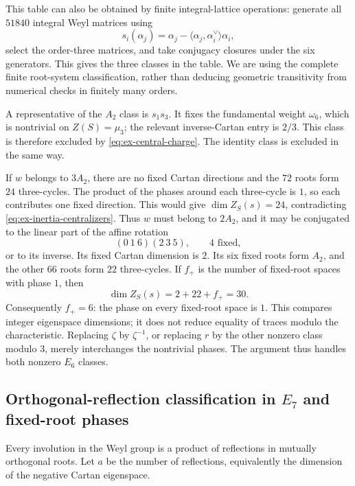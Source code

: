 \documentclass[11pt,a4paper]{article}
\theoremstyle{definition}
\theoremstyle{remark}
\begin{document}
This table can also be obtained by finite integral-lattice operations:
generate all \(51840\) integral Weyl matrices using
\[
s_i(\alpha_j)
=\alpha_j-\langle\alpha_j,\alpha_i^\vee\rangle\alpha_i,
\]
select the order-three matrices, and take conjugacy closures under the
six generators. This gives the three classes in the table.
We are using the complete finite root-system classification, rather than
deducing geometric transitivity from numerical checks in finitely many
orders.

A representative of the \(A_2\) class is \(s_1s_3\). It fixes the
fundamental weight \(\omega_6\), which is nontrivial on
\(Z(S)=\mu_3\); the relevant inverse-Cartan entry is \(2/3\).
This class is therefore excluded by \eqref{eq:ex-central-charge}.
The identity class is excluded in the same way.

If \(w\) belongs to \(3A_2\), there are no fixed Cartan directions and the
\(72\) roots form \(24\) three-cycles. The product of the phases around
each three-cycle is \(1\), so each contributes one fixed direction.
This would give \(\dim Z_S(s)=24\), contradicting
\eqref{eq:ex-inertia-centralizers}.
Thus \(w\) must belong to \(2A_2\), and it may be conjugated to the linear
part of the affine rotation
\begin{equation}\label{eq:ex-e6-affine-action}
(0\ 1\ 6)(2\ 3\ 5),\qquad 4\text{ fixed},
\end{equation}
or to its inverse.
Its fixed Cartan dimension is \(2\). Its six fixed roots form \(A_2\),
and the other \(66\) roots form \(22\) three-cycles.
If \(f_+\) is the number of fixed-root spaces with phase \(1\), then
\begin{equation}\label{eq:ex-e6-fixed-phase-count}
\dim Z_S(s)=2+22+f_+=30.
\end{equation}
Consequently \(f_+=6\): the phase on every fixed-root space is \(1\).
This compares integer eigenspace dimensions; it does not reduce equality
of traces modulo the characteristic.
Replacing \(\zeta\) by \(\zeta^{-1}\), or replacing \(r\) by the other
nonzero class modulo \(3\), merely interchanges the nontrivial phases.
The argument thus handles both nonzero \(E_6\) classes.

\subsection{Orthogonal-reflection classification in \(E_7\) and fixed-root phases}
\label{subsec:ex-e7-weyl}

Every involution in the Weyl group is a product of reflections in mutually
orthogonal roots. Let \(a\) be the number of reflections, equivalently
the dimension of the negative Cartan eigenspace.
\end{document}
